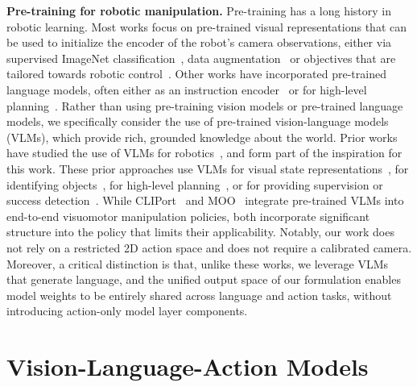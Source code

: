 \textbf{Pre-training for robotic manipulation.} Pre-training has a long history in robotic learning. Most works focus on pre-trained visual representations that can be used to initialize the encoder of the robot's camera observations, either via supervised ImageNet classification~\citep{shah2021rrl}, data augmentation~\citep{laskin2020reinforcement,laskin2020curl,kostrikov2020image,pari2021surprising} or objectives that are tailored towards robotic control~\citep{nair2022r3m,ma2022vip,xiao2022masked,karamcheti2023language,majumdar2023we}. Other works have incorporated pre-trained language models, often either as an instruction encoder~\citep{hill2020human,lynch2020language,nair2022learning,jang2022bc,jiang2022vima,brohan2022rt,shridhar2022perceiver} or for high-level planning~\citep{huang2022language,ahn2022can,driess2023palm,singh2022progprompt,wu2023tidybot,mu2023embodiedgpt}. Rather than using pre-training vision models or pre-trained language models, we specifically consider the use of pre-trained vision-language models (VLMs), which provide rich, grounded knowledge about the world. Prior works have studied the use of VLMs for robotics~\citep{shridhar2021cliport,karamcheti2023language,stone2023open,driess2023palm,gadre2022clip,pmlr-v205-shah23b,du2023vision}, and form part of the inspiration for this work. These prior approaches use VLMs for visual state representations~\citep{karamcheti2023language}, for identifying objects~\citep{stone2023open,gadre2022clip}, for high-level planning~\citep{driess2023palm}, or for providing supervision or success detection~\citep{xiao2022robotic,du2023vision,sumers2023distilling,zhang2023grounding,ma2023liv}. While CLIPort~\citep{shridhar2021cliport} and MOO~\citep{stone2023open} integrate pre-trained VLMs into end-to-end visuomotor manipulation policies, both incorporate significant structure into the policy that limits their applicability. Notably, our work does not rely on a restricted 2D action space and does not require a calibrated camera. %
Moreover, a critical distinction is that, unlike these works, we leverage VLMs that generate language, and the unified output space of our formulation enables model weights to be entirely shared across language and action tasks, without introducing action-only model layer components.   

\section{Vision-Language-Action Models}

\label{sec:method}

